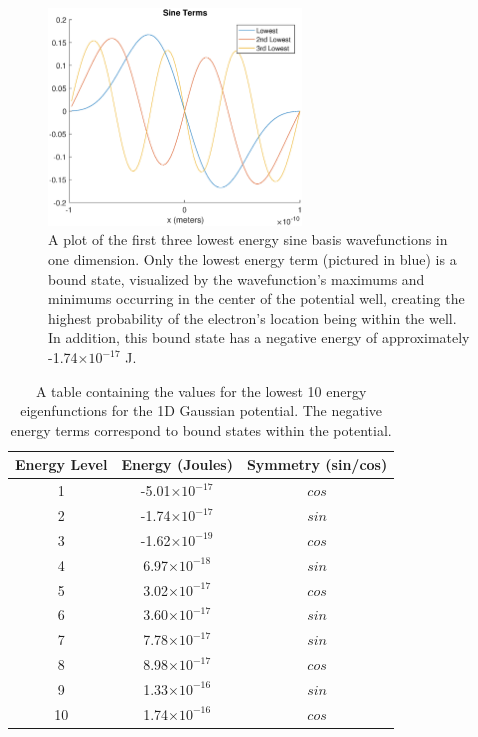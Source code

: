 \documentclass[12pt]{article}
\begin{document}
\begin{figure}
\begin{center}
\includegraphics[width=0.6\textwidth]{./pics/1dsinterms.eps}
\end{center}
\caption{\label{1dsinterms}A plot of the first three lowest energy sine basis wavefunctions in one dimension.  Only the lowest energy term (pictured in blue) is a bound state, visualized by the wavefunction's maximums and minimums occurring in the center of the potential well, creating the highest probability of the electron's location being within the well.  In addition, this bound state has a negative energy of approximately -1.74$\times 10^{-17}$ J.}
\end{figure}

\begin{table}
\begin{center}
\begin{tabular}{|c|c|c|}
\hline
Energy Level & Energy (Joules) & Symmetry (sin/cos) \\
\hline
1 & -5.01$\times 10^{-17}$ & $cos$\\
2 & -1.74$\times 10^{-17}$& $sin$ \\
3 & -1.62$\times 10^{-19}$& $cos$\\
4 & 6.97$\times 10^{-18}$& $sin$\\
5 & 3.02$\times 10^{-17}$ & $cos$ \\
6 &3.60$\times 10^{-17}$ & $sin$ \\
7 & 7.78$\times 10^{-17}$ & $sin$\\
8 & 8.98$\times 10^{-17}$&  $cos$\\
9 & 1.33$\times 10^{-16}$& $sin$ \\
10 & 1.74$\times 10^{-16}$& $cos$ \\
\hline
\end{tabular}
\caption{\label{1denergy} A table containing the values for the lowest 10 energy eigenfunctions for the 1D Gaussian potential.  The negative energy terms correspond to bound states within the potential.}
\end{center}
\end{table}
\end{document}
